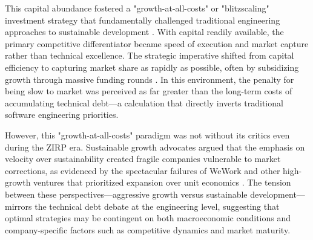 This capital abundance fostered a "growth-at-all-costs" or "blitzscaling" investment strategy that fundamentally challenged traditional engineering approaches to sustainable development \citep{kuratko2020blitzscaling}. With capital readily available, the primary competitive differentiator became speed of execution and market capture rather than technical excellence. The strategic imperative shifted from capital efficiency to capturing market share as rapidly as possible, often by subsidizing growth through massive funding rounds \citep{lee2024startups}. In this environment, the penalty for being slow to market was perceived as far greater than the long-term costs of accumulating technical debt—a calculation that directly inverts traditional software engineering priorities.

However, this "growth-at-all-costs" paradigm was not without its critics even during the \ac{ZIRP} era. Sustainable growth advocates argued that the emphasis on velocity over sustainability created fragile companies vulnerable to market corrections, as evidenced by the spectacular failures of WeWork and other high-growth ventures that prioritized expansion over unit economics \citep{kuratko2020blitzscaling}. The tension between these perspectives—aggressive growth versus sustainable development—mirrors the technical debt debate at the engineering level, suggesting that optimal strategies may be contingent on both macroeconomic conditions and company-specific factors such as competitive dynamics and market maturity.

